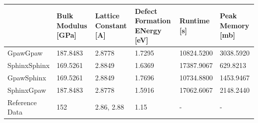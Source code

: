 \begin{tabular}{llllll}
\toprule
 & Bulk Modulus [GPa] & Lattice Constant [A] & Defect Formation ENergy [eV] & Runtime [s] & Peak Memory [mb] \\
\midrule
GpawGpaw & 187.8483 & 2.8778 & 1.7295 & 10824.5200 & 3038.5920 \\
SphinxSphinx & 169.5261 & 2.8849 & 1.6369 & 17387.9067 & 629.8213 \\
GpawSphinx & 169.5261 & 2.8849 & 1.7696 & 10734.8800 & 1453.9467 \\
SphinxGpaw & 187.8483 & 2.8778 & 1.5916 & 17062.6067 & 2148.2440 \\
Reference Data & 152 & 2.86, 2.88 & 1.15 & - & - \\
\bottomrule
\end{tabular}
